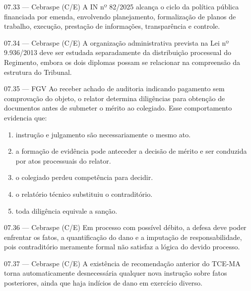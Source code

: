 \begin{questao}{ 07.33 — Cebraspe (C/E)}
A IN nº 82/2025 alcança o ciclo da política pública financiada por emenda, envolvendo planejamento, formalização de planos de trabalho, execução, prestação de informações, transparência e controle.
\end{questao}

\begin{questao}{ 07.34 — Cebraspe (C/E)}
A organização administrativa prevista na Lei nº 9.936/2013 deve ser estudada separadamente da distribuição processual do Regimento, embora os dois diplomas possam se relacionar na compreensão da estrutura do Tribunal.
\end{questao}

\begin{questao}{ 07.35 — FGV}
Ao receber achado de auditoria indicando pagamento sem comprovação do objeto, o relator determina diligências para obtenção de documentos antes de submeter o mérito ao colegiado. Esse comportamento evidencia que:
\begin{enumerate}[label=\Alph*)]
\item instrução e julgamento são necessariamente o mesmo ato.
\item a formação de evidência pode anteceder a decisão de mérito e ser conduzida por atos processuais do relator.
\item o colegiado perdeu competência para decidir.
\item o relatório técnico substituiu o contraditório.
\item toda diligência equivale a sanção.
\end{enumerate}
\end{questao}

\begin{questao}{ 07.36 — Cebraspe (C/E)}
Em processo com possível débito, a defesa deve poder enfrentar os fatos, a quantificação do dano e a imputação de responsabilidade, pois contraditório meramente formal não satisfaz a lógica do devido processo.
\end{questao}

\begin{questao}{ 07.37 — Cebraspe (C/E)}
A existência de recomendação anterior do TCE-MA torna automaticamente desnecessária qualquer nova instrução sobre fatos posteriores, ainda que haja indícios de dano em exercício diverso.
\end{questao}

